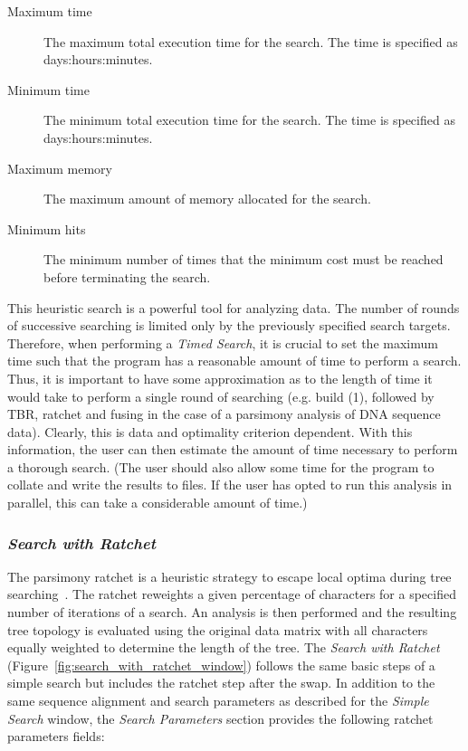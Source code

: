 {\begin{description}
    \item[Maximum time] The maximum total execution time for the search. The time is specified as
        days:hours:minutes.
    \item[Minimum time] The minimum total execution time for the search. The time is specified as
        days:hours:minutes.
    \item[Maximum memory] The maximum amount of memory allocated for the search.
    \item[Minimum hits] The minimum number of times that the minimum cost must be reached before terminating the search.
\end{description}

This heuristic search is a powerful tool for analyzing data. The number of rounds of successive searching is limited only by the previously specified search targets. Therefore, when performing a \emph{Timed Search}, it is crucial to set the maximum time such that the program has a reasonable amount of time to perform a search.  Thus, it is important to have some approximation as to the length of time it would take to perform a single round of searching (e.g. build (1), followed by TBR, ratchet and fusing in the case of a parsimony analysis of DNA sequence data).  Clearly, this is data and optimality criterion dependent.  With this information, the user can then estimate the amount of time necessary to perform a thorough search.  (The user should also allow some time for the program to collate and write the results to files.  If the user has opted to run this analysis in parallel, this can take a considerable amount of time.)

\subsubsection*{\emph{Search with Ratchet}}

The parsimony ratchet is a heuristic strategy to escape  local optima during tree searching~\cite{Nixon1999}. The ratchet reweights a given percentage of characters for a specified number of iterations of a search. An analysis is then performed and the resulting tree topology is evaluated using the original data matrix with all characters equally weighted to determine the length of the tree. The \emph{Search with Ratchet} (Figure~\ref{fig:search_with_ratchet_window}) follows the same basic steps of a simple search but includes the ratchet step after the swap. In addition to the same sequence alignment and search parameters as described for the \emph{Simple Search} window, the \emph{Search Parameters} section provides the following ratchet parameters fields:

}
